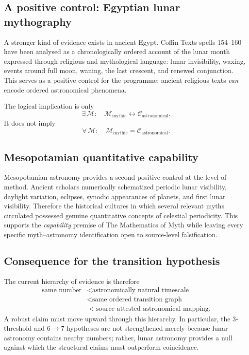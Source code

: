 \subsection{A positive control: Egyptian lunar mythography}

A stronger kind of evidence exists in ancient Egypt.  Coffin Texts spells
154--160 have been analysed as a chronologically ordered account of the lunar
month expressed through religious and mythological language: lunar
invisibility, waxing, events around full moon, waning, the last crescent, and
renewed conjunction.  This serves as a positive control for the programme:
ancient religious texts \emph{can} encode ordered astronomical phenomena.

The logical implication is only
\[
\exists\,\mathcal M:\quad
\mathcal M_{\mathrm{mythic}}\leftrightarrow
\mathcal C_{\mathrm{astronomical}}.
\]
It does not imply
\[
\forall\,\mathcal M:\quad
\mathcal M_{\mathrm{mythic}}=\mathcal C_{\mathrm{astronomical}}.
\]

\subsection{Mesopotamian quantitative capability}

Mesopotamian astronomy provides a second positive control at the level of
method.  Ancient scholars numerically schematized periodic lunar visibility,
daylight variation, eclipses, synodic appearances of planets, and first lunar
visibility.  Therefore the historical cultures in which several relevant
myths circulated possessed genuine quantitative concepts of celestial
periodicity.  This supports the \emph{capability} premise of The Mathematics
of Myth while leaving every specific myth--astronomy identification open to
source-level falsification.

\subsection{Consequence for the transition hypothesis}

The current hierarchy of evidence is therefore
\[
\begin{aligned}
\text{same number}
&<\text{astronomically natural timescale}\\
&<\text{same ordered transition graph}\\
&<\text{source-attested astronomical mapping}.
\end{aligned}
\]
A robust claim must move upward through this hierarchy.  In particular, the
$3$-threshold and $6\to7$ hypotheses are not strengthened merely because lunar
astronomy contains nearby numbers; rather, lunar astronomy provides a null
against which the structural claims must outperform coincidence.


